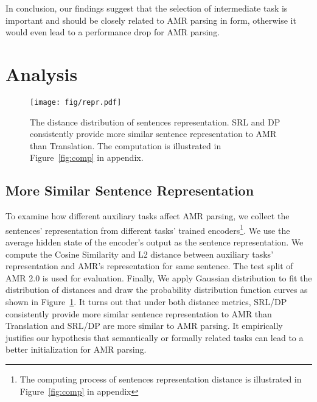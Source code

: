 \documentclass[11pt]{article}
\begin{document}
In conclusion, our findings suggest that the selection of intermediate task is important and should be closely related to AMR parsing in form, otherwise it would even lead to a performance drop for AMR parsing.


 





\section{Analysis}






\begin{figure}[!t]
    \centering
    \texttt{[image:  fig/repr.pdf]}
    \caption{The distance distribution of sentences representation. SRL and DP consistently provide more similar sentence representation to AMR than Translation. The computation is illustrated in Figure~\ref{fig:comp} in appendix.  }
    \label{fig:repr}
\end{figure}

\renewcommand{\thefootnote}{\arabic{footnote}}


\subsection{More Similar Sentence Representation}
To examine how different auxiliary tasks affect AMR parsing, we collect the sentences' representation from different tasks' trained encoders\footnote{The computing process of sentences representation distance is illustrated in Figure~\ref{fig:comp} in appendix}. We use the average hidden state of the encoder's output as the sentence representation. We compute the Cosine Similarity and L2 distance between auxiliary tasks' representation and AMR's representation for same sentence. The test split of AMR 2.0 is used for evaluation. Finally, We apply Gaussian distribution to fit the distribution of distances and draw the probability distribution function curves as shown in Figure~\ref{fig:repr}. It turns out that under both distance metrics, SRL/DP consistently provide more similar sentence representation to AMR than Translation and SRL/DP are more similar to AMR parsing. It empirically justifies our hypothesis that semantically or formally related tasks can lead to a better initialization for AMR parsing.
\end{document}
